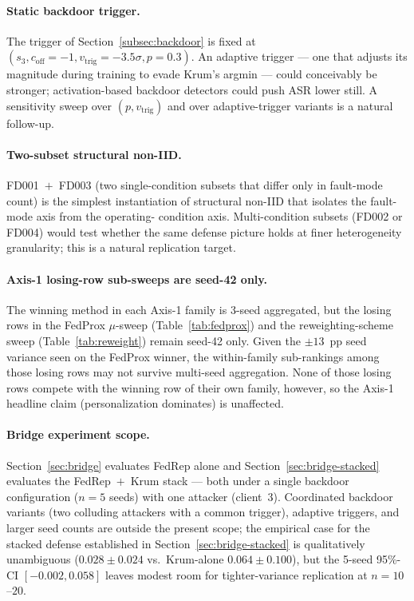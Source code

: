 \documentclass[preprint,12pt,authoryear]{elsarticle}
\begin{document}
\paragraph{Static backdoor trigger.}
The trigger of Section~\ref{subsec:backdoor} is fixed at
$(s_3, c_{\mathrm{off}} = -1, v_{\mathrm{trig}} = -3.5\sigma,
p = 0.3)$. An adaptive trigger --- one that adjusts its magnitude
during training to evade Krum's argmin --- could conceivably be
stronger; activation-based backdoor detectors could push ASR lower
still. A sensitivity sweep over $(p, v_{\mathrm{trig}})$ and over
adaptive-trigger variants is a natural follow-up.

\paragraph{Two-subset structural non-IID.}
FD001~$+$~FD003 (two single-condition subsets that differ only in
fault-mode count) is the simplest instantiation of structural
non-IID that isolates the fault-mode axis from the operating-
condition axis. Multi-condition subsets (FD002 or FD004) would test
whether the same defense picture holds at finer heterogeneity
granularity; this is a natural replication target.

\paragraph{Axis-1 losing-row sub-sweeps are seed-42 only.}
The winning method in each Axis-1 family is 3-seed aggregated, but
the losing rows in the FedProx $\mu$-sweep
(Table~\ref{tab:fedprox}) and the reweighting-scheme sweep
(Table~\ref{tab:reweight}) remain seed-42 only. Given the
$\pm 13$~pp seed variance seen on the FedProx winner, the
within-family sub-rankings among those losing rows may not survive
multi-seed aggregation. None of those losing rows compete with the
winning row of their own family, however, so the Axis-1 headline
claim (personalization dominates) is unaffected.

\paragraph{Bridge experiment scope.}
Section~\ref{sec:bridge} evaluates FedRep alone and
Section~\ref{sec:bridge-stacked} evaluates the FedRep~$+$~Krum stack
--- both under a single backdoor configuration ($n = 5$ seeds) with
one attacker (client~3). Coordinated backdoor variants (two
colluding attackers with a common trigger), adaptive triggers, and
larger seed counts are outside the present scope; the empirical
case for the stacked defense established in
Section~\ref{sec:bridge-stacked} is qualitatively unambiguous
($0.028 \pm 0.024$ vs.\ Krum-alone $0.064 \pm 0.100$), but the
5-seed 95\%-CI $[-0.002, 0.058]$ leaves modest room for
tighter-variance replication at $n = 10$--$20$.
\end{document}
